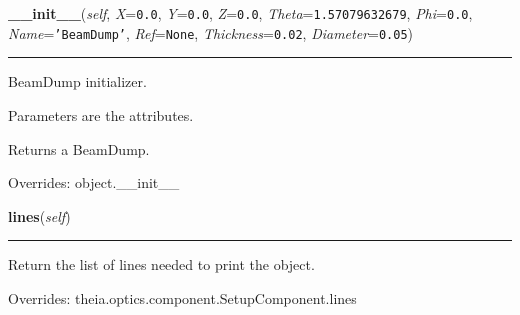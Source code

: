     \vspace{0.5ex}

\hspace{.8\funcindent}\begin{boxedminipage}{\funcwidth}

    \raggedright \textbf{\_\_init\_\_}(\textit{self}, \textit{X}={\tt 0.0}, \textit{Y}={\tt 0.0}, \textit{Z}={\tt 0.0}, \textit{Theta}={\tt 1.57079632679}, \textit{Phi}={\tt 0.0}, \textit{Name}={\tt \texttt{'}\texttt{BeamDump}\texttt{'}}, \textit{Ref}={\tt None}, \textit{Thickness}={\tt 0.02}, \textit{Diameter}={\tt 0.05})

    \vspace{-1.5ex}

    \rule{\textwidth}{0.5\fboxrule}
\setlength{\parskip}{2ex}
    BeamDump initializer.

    Parameters are the attributes.

    Returns a BeamDump.

\setlength{\parskip}{1ex}
      Overrides: object.\_\_init\_\_

    \end{boxedminipage}

    \vspace{0.5ex}

\hspace{.8\funcindent}\begin{boxedminipage}{\funcwidth}

    \raggedright \textbf{lines}(\textit{self})

    \vspace{-1.5ex}

    \rule{\textwidth}{0.5\fboxrule}
\setlength{\parskip}{2ex}
    Return the list of lines needed to print the object.

\setlength{\parskip}{1ex}
      Overrides: theia.optics.component.SetupComponent.lines

    \end{boxedminipage}

    \vspace{0.5ex}

